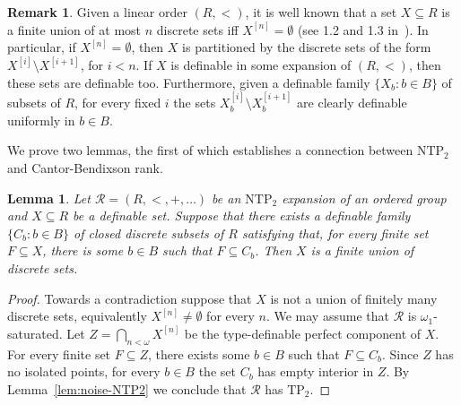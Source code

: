 \documentclass[12pt]{article}
\newcommand{\Rr}{\mathcal{R}}
\newcommand{\NTP}{\ensuremath{\mathrm{NTP}_2}}
\newcommand{\TP}{\ensuremath{\mathrm{TP}_2}}
\newtheorem{lemma}[theorem]{Lemma}
\theoremstyle{definition}
\newtheorem{remark}[theorem]{Remark}
\theoremstyle{remark}
\begin{document}
\begin{remark}\label{rem:discrete-partition}
Given a linear order $(R,<)$, it is well known that a set $X\subseteq R$ is a finite union of at most $n$ discrete sets iff $X^{[n]}=\emptyset$ (see 1.2 and 1.3 in~\cite{FM05-fast-sequences}). In particular, if $X^{[n]}=\emptyset$, then $X$ is partitioned by the discrete sets of the form $X^{[i]} \setminus X^{[i+1]}$, for $i < n$. If $X$ is definable in some expansion of $(R,<)$, then these sets are definable too. Furthermore, given a definable family $\{ X_b : b\in B\}$ of subsets of $R$, for every fixed $i$ the sets $X_b^{[i]} \setminus X_b^{[i+1]}$ are clearly definable uniformly in $b\in B$.  
\end{remark}

We prove two lemmas, the first of which establishes a connection between $\NTP$ and Cantor-Bendixson rank.  

\begin{lemma}\label{lem:ntp2-CBrank}
Let $\Rr=(R,<,+,\ldots)$ be an $\NTP$ expansion of an ordered group and $X\subseteq R$ be a definable set. Suppose that there exists a definable family $\{ C_b : b\in B\}$ of closed discrete subsets of $R$ satisfying that, for every finite set $F\subseteq X$, there is some $b\in B$ such that $F\subseteq C_b$. Then $X$ is a finite union of discrete sets. 
\end{lemma}
\begin{proof}
Towards a contradiction suppose that $X$ is not a union of finitely many discrete sets, equivalently $X^{[n]}\neq \emptyset$ for every $n$. We may assume that $\Rr$ is $\omega_1$-saturated. Let $Z=\bigcap_{n<\omega} X^{[n]}$ be the type-definable perfect component of $X$. For every finite set $F\subseteq Z$, there exists some $b\in B$ such that $F\subseteq C_b$. Since $Z$ has no isolated points, for every $b\in B$ the set $C_b$ has empty interior in $Z$. By Lemma~\ref{lem:noise-NTP2} we conclude that $\Rr$ has $\TP$.
\end{proof}
\end{document}
